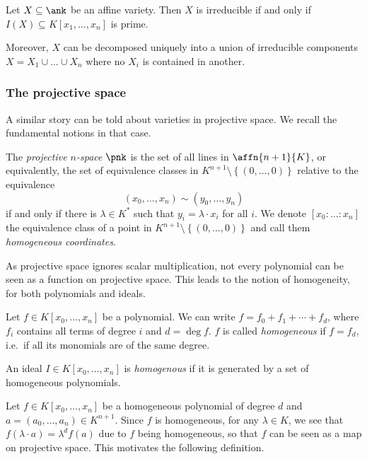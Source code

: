 \begin{theorem}
    Let $X \subseteq \ank$ be an affine variety. Then $X$ is irreducible if and only if $I(X) \subseteq K[x_1, \ldots, x_n]$ is prime.

    Moreover, $X$ can be decomposed uniquely into a union of irreducible components ${X = X_1 \cup \ldots \cup X_n}$ where no $X_i$ is contained in another.
\end{theorem}

\subsubsection{The projective space}

A similar story can be told about varieties in projective space. We recall the fundamental notions in that case.

\begin{defn}
The \emph{projective $n$-space} $\pnk$ is the set of all lines in $\affn{n+1}{K}$, or equivalently, the set of equivalence classes in $K^{n+1} \setminus \left\{(0,\ldots,0)\right\}$ relative to the equivalence
\[ (x_0, \ldots, x_n) \sim (y_0, \ldots, y_n)\]
if and only if there is $\lambda \in K^*$ such that $y_i = \lambda \cdot x_i$ for all $i$. We denote $[x_0:\ldots: x_n]$ the equivalence class of a point in $K^{n+1}\setminus\left\{\left(0, \ldots, 0\right)\right\}$ and call them \emph{homogeneous coordinates}.
\end{defn}

As projective space ignores scalar multiplication, not every polynomial can be seen as a function on projective space. This leads to the notion of homogeneity, for both polynomials and ideals.

\begin{defn}
    Let $f \in K[x_0, \ldots, x_n]$ be a polynomial. We can write $f = f_0 + f_1 + \cdots + f_d$, where $f_i$ contains all terms of degree $i$ and $d = \deg{f}$. $f$ is called \emph{homogeneous} if $f = f_d$, i.e.\ if all its monomials are of the same degree.

    An ideal $I \in K[x_0, \ldots, x_n]$ is \emph{homogenous} if it is generated by a set of homogeneous polynomials.
\end{defn}

Let $f \in K[x_0, \ldots, x_n]$ be a homogeneous polynomial of degree $d$ and $ {a = (a_0, \ldots, a_n) \in K^{n+1}}$. Since $f$ is homogeneous, for any $\lambda \in K$, we see that ${f(\lambda \cdot a) = \lambda^d f(a)}$ due to $f$ being homogeneous, so that $f$ can be seen as a map on projective space. This motivates the following definition.


